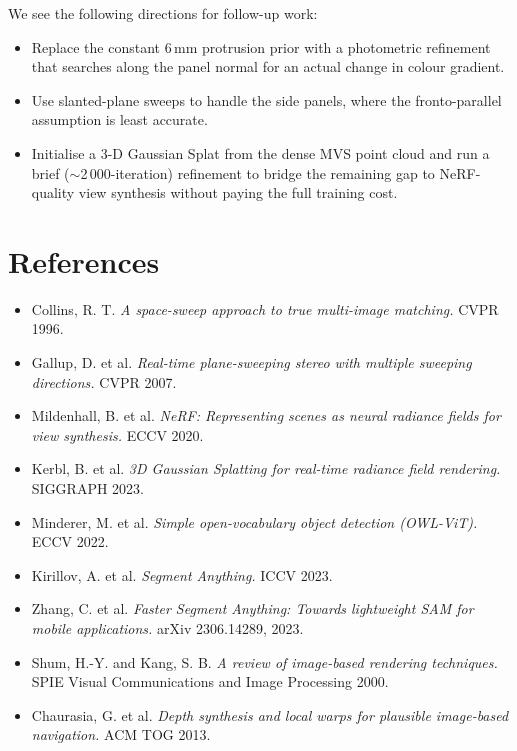 \documentclass[11pt,a4paper]{article}
\begin{document}
We see the following directions for follow-up work:

\begin{itemize}[leftmargin=1em,itemsep=0.1em]
    \item Replace the constant 6\,mm protrusion prior with a photometric refinement that searches along the panel normal for an actual change in colour gradient.
    \item Use slanted-plane sweeps to handle the side panels, where the fronto-parallel assumption is least accurate.
    \item Initialise a 3-D Gaussian Splat from the dense MVS point cloud and run a brief ($\sim$2\,000-iteration) refinement to bridge the remaining gap to NeRF-quality view synthesis without paying the full training cost.
\end{itemize}

\section{References}

\begin{itemize}[leftmargin=1em,itemsep=0.2em,label={}]
    \item Collins, R. T. \textit{A space-sweep approach to true multi-image matching.} CVPR 1996.
    \item Gallup, D. et al. \textit{Real-time plane-sweeping stereo with multiple sweeping directions.} CVPR 2007.
    \item Mildenhall, B. et al. \textit{NeRF: Representing scenes as neural radiance fields for view synthesis.} ECCV 2020.
    \item Kerbl, B. et al. \textit{3D Gaussian Splatting for real-time radiance field rendering.} SIGGRAPH 2023.
    \item Minderer, M. et al. \textit{Simple open-vocabulary object detection (OWL-ViT).} ECCV 2022.
    \item Kirillov, A. et al. \textit{Segment Anything.} ICCV 2023.
    \item Zhang, C. et al. \textit{Faster Segment Anything: Towards lightweight SAM for mobile applications.} arXiv 2306.14289, 2023.
    \item Shum, H.-Y. and Kang, S. B. \textit{A review of image-based rendering techniques.} SPIE Visual Communications and Image Processing 2000.
    \item Chaurasia, G. et al. \textit{Depth synthesis and local warps for plausible image-based navigation.} ACM TOG 2013.
\end{itemize}
\end{document}
